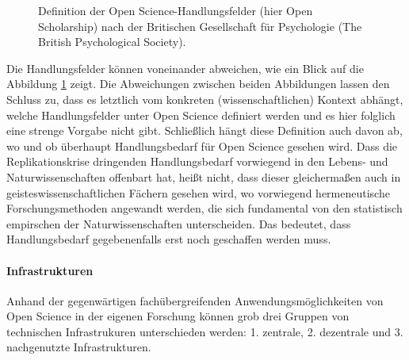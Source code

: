\begin{figure}[h]
    \centering
    \caption{Definition der Open Science-Handlungsfelder (hier Open Scholarship) nach der Britischen Gesellschaft für Psychologie (The British Psychological Society).\protect\footnotemark}
    \label{fig:openscience2}
\end{figure} 

Die Handlungsfelder können voneinander abweichen, wie ein Blick auf die Abbildung \ref{fig:openscience2} zeigt. Die Abweichungen zwischen beiden Abbildungen lassen den Schluss zu, dass es letztlich vom konkreten (wissenschaftlichen) Kontext abhängt, welche Handlungsfelder unter Open Science definiert werden und es hier folglich eine strenge Vorgabe nicht gibt. Schließlich hängt diese Definition auch davon ab, wo und ob überhaupt Handlungsbedarf für Open Science gesehen wird. Dass die Replikationskrise dringenden Handlungsbedarf vorwiegend in den Lebens- und Naturwissenschaften offenbart hat, heißt nicht, dass dieser gleichermaßen auch in geisteswissenschaftlichen Fächern gesehen wird, wo vorwiegend hermeneutische Forschungsmethoden angewandt werden, die sich fundamental von den statistisch empirschen der Naturwissenschaften unterscheiden. Das bedeutet, dass Handlungsbedarf gegebenenfalls erst noch geschaffen werden muss. 

\paragraph{Infrastrukturen} Anhand der gegenwärtigen fachübergreifenden Anwendungsmöglichkeiten von Open Science in der eigenen Forschung können grob drei Gruppen von technischen Infrastrukuren unterschieden werden: 1. zentrale, 2. dezentrale und 3. nachgenutzte Infrastrukturen.

